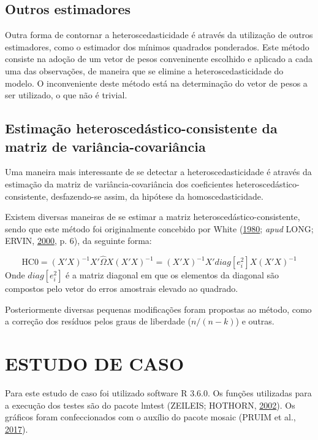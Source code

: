 \documentclass[a4paper, 12pt]{article}
\newcommand{\pkg}[1]{{\normalfont\fontseries{b}\selectfont #1}}
\let\proglang=\textsf
\begin{document}
\hypertarget{outros-estimadores}{%
\subsection{Outros estimadores}\label{outros-estimadores}}

Outra forma de contornar a heteroscedasticidade é através da utilização
de outros estimadores, como o estimador dos mínimos quadrados
ponderados. Este método consiste na adoção de um vetor de pesos
conveninente escolhido e aplicado a cada uma das observações, de maneira
que se elimine a heteroscedasticidade do modelo. O inconveniente deste
método está na determinação do vetor de pesos a ser utilizado, o que não
é trivial.

\hypertarget{estimacao-heteroscedastico-consistente-da-matriz-de-variancia-covariancia}{%
\subsection{Estimação heteroscedástico-consistente da matriz de
variância-covariância}\label{estimacao-heteroscedastico-consistente-da-matriz-de-variancia-covariancia}}

Uma maneira mais interessante de se detectar a heteroscedasticidade é
através da estimação da matriz de variância-covariância dos coeficientes
heteroscedástico-consistente, desfazendo-se assim, da hipótese da
homoscedasticidade.

Existem diversas maneiras de se estimar a matriz
heteroscedástico-consistente, sendo que este método foi originalmente
concebido por White (\protect\hyperlink{ref-white1980}{1980};
\emph{apud} LONG; ERVIN, \protect\hyperlink{ref-Long}{2000}, p. 6), da
seguinte forma:

\[\text{HC0}=(X'X)^{-1}X' \hat{\Omega} X(X'X)^{-1} = (X'X)^{-1}X' diag[e_i^2] X(X'X)^{-1}\]
Onde \(diag[e_i^2]\) é a matriz diagonal em que os elementos da diagonal
são compostos pelo vetor do erros amostrais elevado ao quadrado.

Posteriormente diversas pequenas modificações foram propostas ao método,
como a correção dos resíduos pelos graus de liberdade (\(n/(n-k)\)) e
outras.

\hypertarget{estudo-de-caso}{%
\section{ESTUDO DE CASO}\label{estudo-de-caso}}

Para este estudo de caso foi utilizado software \proglang{R} 3.6.0. Os
funções utilizadas para a execução dos testes são do pacote \pkg{lmtest}
(ZEILEIS; HOTHORN, \protect\hyperlink{ref-lmtest}{2002}). Os gráficos
foram confeccionados com o auxílio do pacote \pkg{mosaic} (PRUIM et al.,
\protect\hyperlink{ref-mosaic}{2017}).
\end{document}

